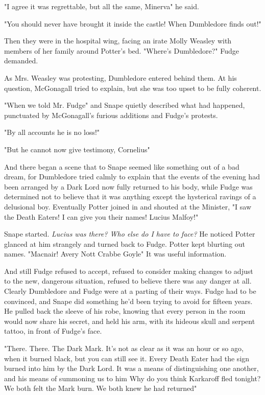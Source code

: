 "I agree it was regrettable, but all the same, Minerva{\el}" he said.

"You should never have brought it inside the castle! When Dumbledore finds out{\el}!"

Then they were in the hospital wing, facing an irate Molly Weasley with members of her family around Potter's bed. "Where's Dumbledore?" Fudge demanded.

As Mrs. Weasley was protesting, Dumbledore entered behind them. At his question, McGonagall tried to explain, but she was too upset to be fully coherent.

"When we told Mr. Fudge{\el}" and Snape quietly described what had happened, punctuated by McGonagall's furious additions and Fudge's protests.

"By all accounts he is no loss!"

"But he cannot now give testimony, Cornelius{\el}"

And there began a scene that to Snape seemed like something out of a bad dream, for Dumbledore tried calmly to explain that the events of the evening had been arranged by a Dark Lord now fully returned to his body, while Fudge was determined not to believe that it was anything except the hysterical ravings of a delusional boy. Eventually Potter joined in and shouted at the Minister, "I saw the Death Eaters! I can give you their names! Lucius Malfoy{\el}!"

Snape started. \emph{Lucius was there? Who else do I have to face?} He noticed Potter glanced at him strangely and turned back to Fudge. Potter kept blurting out names. "Macnair! Avery{\el} Nott{\el} Crabbe{\el} Goyle{\el}" It was useful information.

And still Fudge refused to accept, refused to consider making changes to adjust to the new, dangerous situation, refused to believe there was any danger at all. Clearly Dumbledore and Fudge were at a parting of their ways. Fudge had to be convinced, and Snape did something he'd been trying to avoid for fifteen years. He pulled back the sleeve of his robe, knowing that every person in the room would now share his secret, and held his arm, with its hideous skull and serpent tattoo, in front of Fudge's face.

"There. There. The Dark Mark. It's not as clear as it was an hour or so ago, when it burned black, but you can still see it. Every Death Eater had the sign burned into him by the Dark Lord. It was a means of distinguishing one another, and his means of summoning us to him{\el} Why do you think Karkaroff fled tonight? We both felt the Mark burn. We both knew he had returned{\el}"


